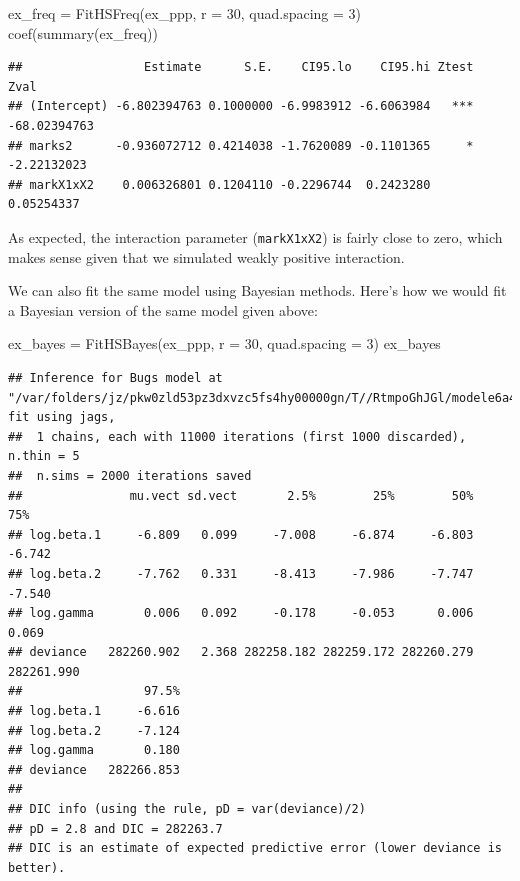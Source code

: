 \documentclass[
]{book}
\newenvironment{Shaded}{\begin{snugshade}}{\end{snugshade}}
\newcommand{\AttributeTok}[1]{\textcolor[rgb]{0.77,0.63,0.00}{#1}}
\newcommand{\DecValTok}[1]{\textcolor[rgb]{0.00,0.00,0.81}{#1}}
\newcommand{\FunctionTok}[1]{\textcolor[rgb]{0.00,0.00,0.00}{#1}}
\newcommand{\NormalTok}[1]{#1}
\newcommand{\OtherTok}[1]{\textcolor[rgb]{0.56,0.35,0.01}{#1}}
\begin{document}
\begin{Shaded}
\begin{Highlighting}[]
\NormalTok{ex\_freq }\OtherTok{=} \FunctionTok{FitHSFreq}\NormalTok{(ex\_ppp, }\AttributeTok{r =} \DecValTok{30}\NormalTok{, }\AttributeTok{quad.spacing =} \DecValTok{3}\NormalTok{)}
\FunctionTok{coef}\NormalTok{(}\FunctionTok{summary}\NormalTok{(ex\_freq))}
\end{Highlighting}
\end{Shaded}

\begin{verbatim}
##                 Estimate      S.E.    CI95.lo    CI95.hi Ztest         Zval
## (Intercept) -6.802394763 0.1000000 -6.9983912 -6.6063984   *** -68.02394763
## marks2      -0.936072712 0.4214038 -1.7620089 -0.1101365     *  -2.22132023
## markX1xX2    0.006326801 0.1204110 -0.2296744  0.2423280         0.05254337
\end{verbatim}

As expected, the interaction parameter (\texttt{markX1xX2}) is fairly close to zero, which makes sense given that we simulated weakly positive interaction.

We can also fit the same model using Bayesian methods. Here's how we would fit a Bayesian version of the same model given above:

\begin{Shaded}
\begin{Highlighting}[]
\NormalTok{ex\_bayes }\OtherTok{=} \FunctionTok{FitHSBayes}\NormalTok{(ex\_ppp, }\AttributeTok{r =} \DecValTok{30}\NormalTok{, }\AttributeTok{quad.spacing =} \DecValTok{3}\NormalTok{)}
\NormalTok{ex\_bayes}
\end{Highlighting}
\end{Shaded}

\begin{verbatim}
## Inference for Bugs model at "/var/folders/jz/pkw0zld53pz3dxvzc5fs4hy00000gn/T//RtmpoGhJGl/modele6a46b99c05.txt", fit using jags,
##  1 chains, each with 11000 iterations (first 1000 discarded), n.thin = 5
##  n.sims = 2000 iterations saved
##               mu.vect sd.vect       2.5%        25%        50%        75%
## log.beta.1     -6.809   0.099     -7.008     -6.874     -6.803     -6.742
## log.beta.2     -7.762   0.331     -8.413     -7.986     -7.747     -7.540
## log.gamma       0.006   0.092     -0.178     -0.053      0.006      0.069
## deviance   282260.902   2.368 282258.182 282259.172 282260.279 282261.990
##                 97.5%
## log.beta.1     -6.616
## log.beta.2     -7.124
## log.gamma       0.180
## deviance   282266.853
## 
## DIC info (using the rule, pD = var(deviance)/2)
## pD = 2.8 and DIC = 282263.7
## DIC is an estimate of expected predictive error (lower deviance is better).
\end{verbatim}
\end{document}
